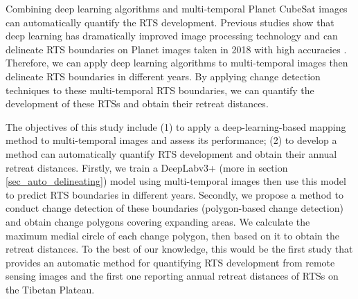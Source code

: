 \documentclass[authoryear,preprint,review,12pt]{elsarticle}
\begin{document}
Combining deep learning algorithms and multi-temporal Planet CubeSat images can automatically quantify the RTS development.
Previous studies show that deep learning has dramatically improved image processing technology \citep{leCun2015Deep} and can delineate RTS boundaries on Planet images taken in 2018 with high accuracies \citep{huang2020using}. 
Therefore, we can apply deep learning algorithms to multi-temporal images then delineate RTS boundaries in different years.
By applying %
change detection techniques to these multi-temporal RTS boundaries, we can quantify the development of these RTSs and obtain their retreat distances. 


The objectives of this study include (1) to apply a deep-learning-based mapping method to multi-temporal images and assess its performance; (2) to develop a method can automatically quantify RTS development 
and obtain their annual retreat distances.
Firstly, we train a DeepLabv3+ (more in section \ref{sec_auto_delineating}) model using multi-temporal images then use this model to predict RTS boundaries in different years.
Secondly, we propose a method to conduct change detection of these boundaries (polygon-based change detection)  and obtain change polygons covering expanding areas.  
We calculate the maximum medial circle of each change polygon, then based on it to obtain the retreat distances.  
To the best of our knowledge, this would be the first study that provides an automatic method for quantifying RTS development from remote sensing images and the first one reporting annual retreat distances of RTSs on the Tibetan Plateau. 

\end{document}
